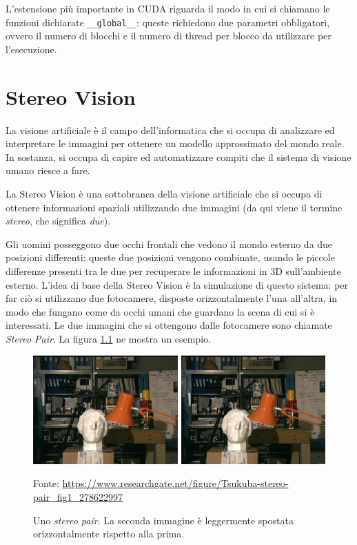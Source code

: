 \documentclass[12pt,a4paper,openright,twoside]{report}
\newcommand{\source}[1]{\vspace{-10pt} \caption*{\scriptsize Fonte: {#1}} }
\begin{document}
L'estensione più importante in CUDA riguarda il modo in cui si chiamano le funzioni dichiarate \verb|__global__|: queste richiedono due parametri obbligatori, ovvero il numero di blocchi e il numero di thread per blocco da utilizzare per l'esecuzione.

\chapter{Stereo Vision}

La visione artificiale è il campo dell'informatica che si occupa di analizzare ed interpretare le immagini per ottenere un modello approssimato del mondo reale. In sostanza, si occupa di capire ed automatizzare compiti che il sistema di visione umano riesce a fare.

La Stereo Vision è una sottobranca della visione artificiale che si occupa di ottenere informazioni spaziali utilizzando due immagini (da qui viene il termine \textit{stereo}, che significa \textit{due}).

Gli uomini posseggono due occhi frontali che vedono il mondo esterno da due posizioni differenti: queste due posizioni vengono combinate, usando le piccole differenze presenti tra le due per recuperare le informazioni in 3D sull'ambiente esterno. L'idea di base della Stereo Vision è la simulazione di questo sistema: per far ciò si utilizzano due fotocamere, disposte orizzontalmente l'una all'altra, in modo che fungano come da occhi umani che guardano la scena di cui si è interessati. Le due immagini che si ottengono dalle fotocamere sono chiamate \textit{Stereo Pair}. La figura \ref{img:stereo_pair} ne mostra un esempio.

\begin{figure}[h]
    \centering
    \includegraphics[width=\textwidth]{tsukuba-stereo-pair.png}
    \caption[Un esempio di \textit{stereo pair}.]{Uno \textit{stereo pair}. La seconda immagine è leggermente spostata orizzontalmente rispetto alla prima.}
    \source{\url{https://www.researchgate.net/figure/Tsukuba-stereo-pair_fig1_278622997}}
    \label{img:stereo_pair}
\end{figure}
\end{document}
